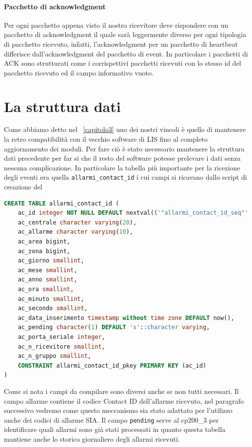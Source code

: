 \paragraph{Pacchetto di acknowledgment}
Per ogni pacchetto appena visto il nostro ricevitore deve rispondere con un pacchetto di acknowledgment il quale sarà leggermente diverso per ogni tipologia di pacchetto ricevuto, infatti, l'acknowledgment per un pacchetto di heartbeat differisce dall'acknowledgment del pacchetto di event. In particolare i pacchetti di ACK sono strutturati come i corrispettivi pacchetti ricevuti con lo stesso id del pacchetto ricevuto ed il campo informativo vuoto.
\section{La struttura dati}
Come abbiamo detto nel \chaptername~\ref{capitolo3} uno dei nostri vincoli è quello di mantenere la retro compatibilità con il vecchio software di LIS fino al completo aggiornamento dei moduli. Per fare ciò è stato necessario mantenere la struttura dati precedente per far si che il resto del software potesse prelevare i dati senza nessuna complicazione. In particolare la tabella più importante per la ricezione degli eventi era quella \texttt{allarmi\_contact\_id} i cui campi si ricavano dallo script di creazione del 
\begin{lstlisting}[language=SQL,caption=Tabella allarmi\_contact\_id,label=lst:allarmicontactid]
CREATE TABLE allarmi_contact_id (
    ac_id integer NOT NULL DEFAULT nextval(('"allarmi_contact_id_seq"'::text)::regclass),
    ac_centrale character varying(20),
    ac_allarme character varying(10),
    ac_area bigint,
    ac_zona bigint,
    ac_giorno smallint,
    ac_mese smallint,
    ac_anno smallint,
    ac_ora smallint,
    ac_minuto smallint,
    ac_secondo smallint,
    ac_data_inserimento timestamp without time zone DEFAULT now(),
    ac_pending character(1) DEFAULT 's'::character varying,
    ac_porta_seriale integer,
    ac_n_ricevitore smallint,
    ac_n_gruppo smallint,
    CONSTRAINT allarmi_contact_id_pkey PRIMARY KEY (ac_id)
)
\end{lstlisting}
Come si nota i campi da compilare sono diversi anche se non tutti necessari. Il campo allarme contiene il codice Contact ID dell'allarme ricevuto, nel paragrafo successivo vedremo come questo meccanismo sia stato adattato per l'utilizzo anche dei codici di allarme SIA. Il campo \texttt{pending} serve al cp200\_3 per identificare quali allarmi sono già stati processati in quanto questa tabella mantiene anche lo storico giornaliero degli allarmi ricevuti.\\
